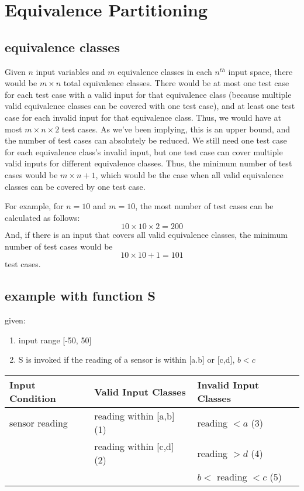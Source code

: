 \documentclass[letterpaper]{article}
\begin{document}
\section{Equivalence Partitioning}
\subsection{equivalence classes}
Given $n$ input variables and $m$ equivalence classes in each $n^{th}$
input space, there would be $m \times n$ total equivalence classes.
There would be at most one test case for each test case with a valid input for
that equivalence class (because multiple valid equivalence classes can be
covered with one test case), and at least one test case for each invalid input
for that equivalence class. Thus, we would have at most $m \times n \times 2$
test cases. As we've been implying, this is an upper bound, and the number of
test cases can absolutely be reduced. We still need one test case for each
equivalence class's invalid input, but one test case can cover multiple
valid inputs for different equivalence classes. Thus, the minimum number
of test cases would be $m \times n + 1$, which would be the case when
all valid equivalence classes can be covered by one test case.

For example, for $n=10$ and $m=10$, the most number of test cases can be
calculated as follows:
\[ 10 \times 10 \times 2 = 200 \]
And, if there is an input that covers all valid equivalence classes, the
minimum number of test cases would be
\[ 10 \times 10 + 1 = 101 \] test cases.

\subsection{example with function S}
given:
\begin{enumerate}
	\item input range [-50, 50]
	\item S is invoked if the reading of a sensor is within [a.b] or [c,d], $b < c$
\end{enumerate}

\begin{adjustbox}{center}
	\begin{tabularx}{1.2\textwidth}{X|X|X|}
		Input Condition & Valid Input Classes      & Invalid Input Classes    \\ \hline
		sensor reading  & reading within [a,b] (1) & reading $<a$ (3)         \\
				& reading within [c,d] (2) & reading $>d$ (4)         \\
				&                          & $b <$ reading $< c$ (5)  \\ \hline
	\end{tabularx}
\end{adjustbox}
\end{document}
